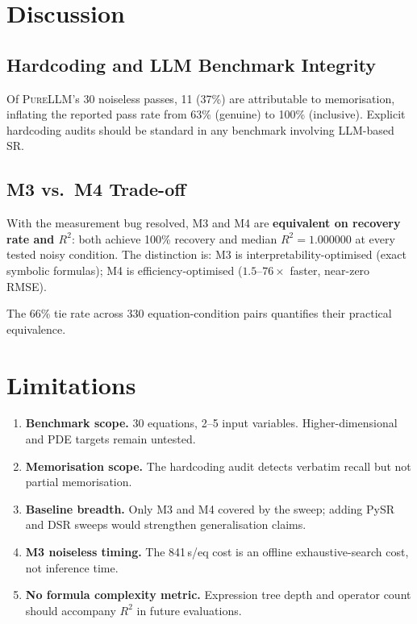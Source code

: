 \documentclass[twoside,11pt]{article}
\newcommand{\PureLLM}{\textsc{PureLLM}}
\newcommand{\Rsq}{R^{2}}
\begin{document}
\section{Discussion}
\label{sec:discussion}

\subsection{Hardcoding and LLM Benchmark Integrity}

Of \PureLLM{}'s 30 noiseless passes, 11 (37\%) are attributable to
memorisation, inflating the reported pass rate from 63\% (genuine) to
100\% (inclusive).  Explicit hardcoding audits should be standard in any
benchmark involving LLM-based SR.

\subsection{M3 vs.\ M4 Trade-off}

With the measurement bug resolved, M3 and M4 are \textbf{equivalent on
recovery rate and $\Rsq$}: both achieve 100\% recovery and median
$\Rsq = 1.000000$ at every tested noisy condition.  The distinction is:
M3 is interpretability-optimised (exact symbolic formulas); M4 is
efficiency-optimised ($1.5$--$76\times$ faster, near-zero RMSE).

The 66\% tie rate across 330 equation-condition pairs quantifies their
practical equivalence.

\section{Limitations}
\label{sec:limitations}

\begin{enumerate}
  \item \textbf{Benchmark scope.} 30 equations, 2--5 input variables.
    Higher-dimensional and PDE targets remain untested.
  \item \textbf{Memorisation scope.} The hardcoding audit detects verbatim
    recall but not partial memorisation.
  \item \textbf{Baseline breadth.} Only M3 and M4 covered by the sweep;
    adding PySR and DSR sweeps would strengthen generalisation claims.
  \item \textbf{M3 noiseless timing.} The 841\,s/eq cost is an offline
    exhaustive-search cost, not inference time.
  \item \textbf{No formula complexity metric.} Expression tree depth and
    operator count should accompany $\Rsq$ in future evaluations.
\end{enumerate}
\end{document}
